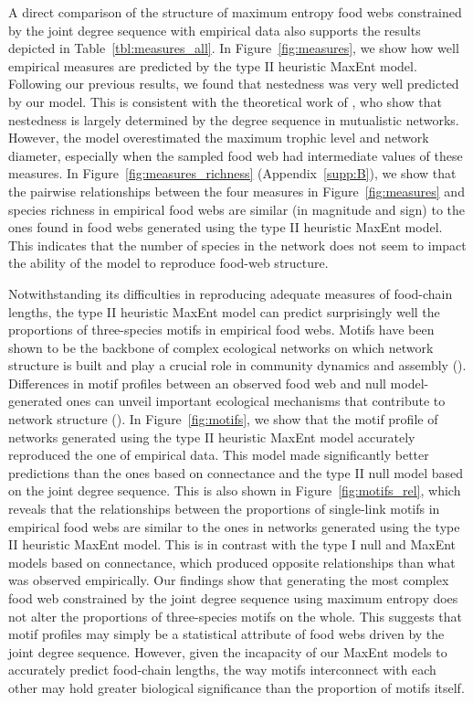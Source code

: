 A direct comparison of the structure of maximum entropy food webs constrained by
the joint degree sequence with empirical data also supports the results depicted
in Table~\ref{tbl:measures_all}. In Figure~\ref{fig:measures}, we show how well
empirical measures are predicted by the type II heuristic MaxEnt model.
Following our previous results, we found that nestedness was very well predicted
by our model. This is consistent with the theoretical work of
\textcite{Payrato-Borras2019Breaking}, who show that nestedness is largely
determined by the degree sequence in mutualistic networks. However, the model
overestimated the maximum trophic level and network diameter, especially when
the sampled food web had intermediate values of these measures. In
Figure~\ref{fig:measures_richness} (Appendix~\ref{supp:B}), we show that the
pairwise relationships between the four measures in Figure~\ref{fig:measures}
and species richness in empirical food webs are similar (in magnitude and sign)
to the ones found in food webs generated using the type II heuristic MaxEnt
model. This indicates that the number of species in the network does not seem to
impact the ability of the model to reproduce food-web structure. 

Notwithstanding its difficulties in reproducing adequate measures of food-chain
lengths, the type II heuristic MaxEnt model can predict surprisingly well the
proportions of three-species motifs in empirical food webs. Motifs have been
shown to be the backbone of complex ecological networks on which network
structure is built and play a crucial role in community dynamics and assembly
(\cite{Stouffer2011Compartmentalization}). Differences in motif profiles between an observed
food web and null model-generated ones can unveil important ecological
mechanisms that contribute to network structure (\cite{Stouffer2007Evidence}). In
Figure~\ref{fig:motifs}, we show that the motif profile of networks generated using the
type II heuristic MaxEnt model accurately reproduced the one of empirical data.
This model made significantly better predictions than the ones based on
connectance and the type II null model based on the joint degree sequence. This
is also shown in Figure~\ref{fig:motifs_rel}, which reveals that the relationships
between the proportions of single-link motifs in empirical food webs are similar
to the ones in networks generated using the type II heuristic MaxEnt model. This
is in contrast with the type I null and MaxEnt models based on connectance,
which produced opposite relationships than what was observed empirically. Our
findings show that generating the most complex food web constrained by the joint
degree sequence using maximum entropy does not alter the proportions of
three-species motifs on the whole. This suggests that motif profiles may simply
be a statistical attribute of food webs driven by the joint degree sequence.
However, given the incapacity of our MaxEnt models to accurately predict
food-chain lengths, the way motifs interconnect with each other may hold greater
biological significance than the proportion of motifs itself. 

